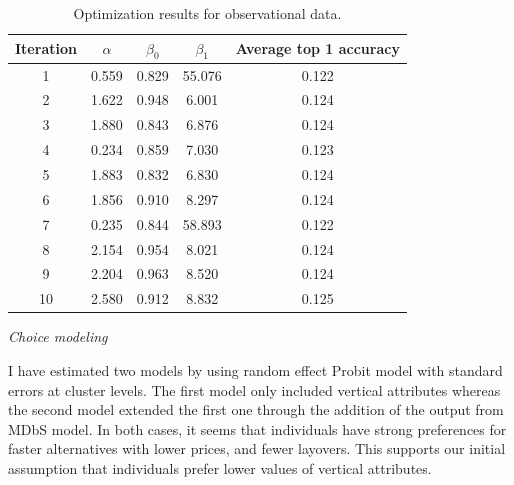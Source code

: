 \documentclass[a4paper,12pt]{article}
\begin{document}
\begin{table}
\centering
\begin{tabular}{ccccc}
\hline
Iteration & $\alpha$ & $\beta_0$ & $\beta_1$ & Average top 1 accuracy \\
\hline
1 & 0.559 & 0.829 & 55.076 & 0.122 \\
2 & 1.622 & 0.948 & 6.001 & 0.124 \\
3 & 1.880 & 0.843 & 6.876 & 0.124 \\
4 & 0.234 & 0.859 & 7.030 & 0.123 \\
5 & 1.883 & 0.832 & 6.830 & 0.124 \\
6 & 1.856 & 0.910 & 8.297 & 0.124 \\
7 & 0.235 & 0.844 & 58.893 & 0.122 \\
8 & 2.154 & 0.954 & 8.021 & 0.124 \\
9 & 2.204 & 0.963 & 8.520 & 0.124 \\
10 & 2.580 & 0.912 & 8.832 & 0.125 \\
\hline
\end{tabular}
\caption{Optimization results for observational data.}
\label{tab:optimizationAmadeusResults}
\end{table}


\textit{Choice modeling}

I have estimated two models by using random effect Probit model with standard errors at cluster levels. The first model only included vertical attributes whereas the second model extended the first one through the addition of the output from MDbS model. In both cases, it seems that individuals have strong preferences for faster alternatives with lower prices, and fewer layovers. This supports our initial assumption that individuals prefer lower values of vertical attributes. 
\end{document}
